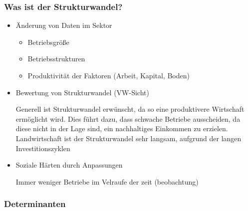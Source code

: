 \documentclass[11pt]{scrbook}
\begin{document}
\subsubsection{Was ist der Strukturwandel?}
\begin{itemize}
	\item{Änderung von Daten im Sektor}
	\begin{itemize}
		\item Betriebsgröße
		
		\item Betriebsstrukturen

		\item Produktivität der Faktoren (Arbeit, Kapital, Boden)
	\end{itemize}
	\item{Bewertung von Strukturwandel (\ac{VW}-Sicht)}

		Generell ist Strukturwandel erwünscht, da so eine produktivere Wirtschaft ermöglicht wird. Dies führt dazu, dass \glqq schwache\grqq{}  Betriebe ausscheiden, da diese nicht in der Lage sind, ein nachhaltiges Einkommen zu erzielen.
Landwirtschaft ist der Strukturwandel sehr langsam, aufgrund der langen Investitionszyklen
	\item{Soziale Härten durch Anpassungen}

Immer weniger Betriebe im Velraufe der zeit (beobachtung)

\end{itemize}


\subsubsection{Determinanten}
\end{document}
